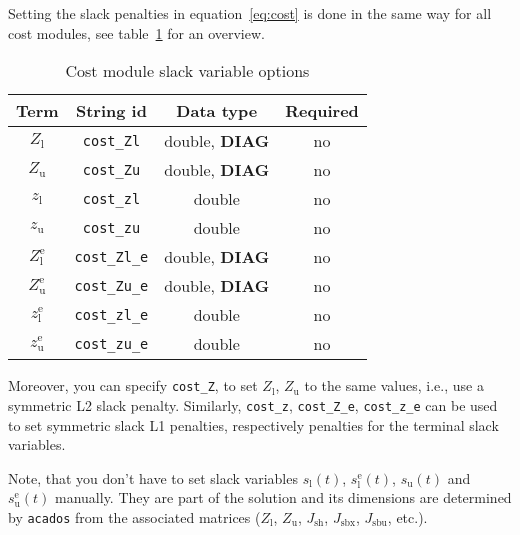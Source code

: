 \documentclass[english]{article}
\newcommand{\code}[1]{\texttt{#1}}
\newcommand{\acados}{\texttt{acados}}
\newcommand{\ind}[1]{_{\textrm{#1}}}
\newcommand{\terminal}{^{\textrm{e}}}
\newcommand{\Lower}{\ind{l}}
\newcommand{\upper}{\ind{u}}
\newcommand{\optional}{no}
\begin{document}
Setting the slack penalties in equation~\eqref{eq:cost} is done in the same way for all cost modules, see table~\ref{tab:cost:slack} for an overview.
%
\begin{table}[h!]
    \centering
    \caption{Cost module slack variable options} \label{tab:cost:slack}
    \begin{tabular}{cccc}
        \toprule
        Term  & String id & Data type & Required \\ \midrule
        $ Z\Lower $          & \code{cost\_Zl}    & double, \textbf{DIAG}  & \optional \\
        $ Z\upper $          & \code{cost\_Zu}    & double, \textbf{DIAG}  & \optional   \\
        $ z\Lower $          & \code{cost\_zl}    & double  & \optional   \\
        $ z\upper $          & \code{cost\_zu}    & double  & \optional   \\ [1em]
        $ Z\Lower\terminal $ & \code{cost\_Zl\_e} & double, \textbf{DIAG} & \optional   \\
        $ Z\upper\terminal $ & \code{cost\_Zu\_e} & double, \textbf{DIAG} & \optional   \\
        $ z\Lower\terminal $ & \code{cost\_zl\_e} & double  & \optional   \\
        $ z\upper\terminal $ & \code{cost\_zu\_e} & double  & \optional   \\
        \bottomrule
    \end{tabular}
\end{table}
%
Moreover, you can specify \code{cost\_Z}, to set $ Z\Lower$, $Z\upper$ to the same values, i.e., use a symmetric L2 slack penalty.
Similarly, \code{cost\_z}, \code{cost\_Z\_e}, \code{cost\_z\_e} can be used to set symmetric slack L1 penalties, respectively penalties for the terminal slack variables.

Note, that you don't have to set slack variables $s\Lower(t)$, $s\Lower\terminal(t)$, $s\upper(t)$ and $s\upper\terminal(t)$ manually. They are part of the solution and its dimensions are determined by \acados{} from the associated matrices ($Z\Lower$, $Z\upper$,  $J\ind{sh}$, $J\ind{sbx}$, $J\ind{sbu}$, etc.).
%
\end{document}
